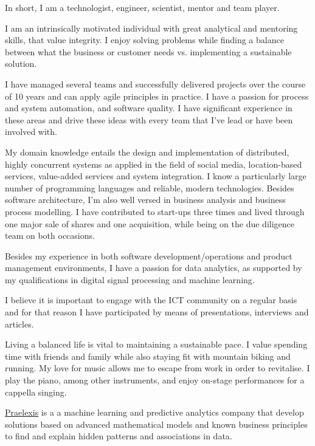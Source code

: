 \documentclass[10pt,a4paper,final]{columncv}
\begin{document}
\pagebreak



In short, I am a technologist, engineer, scientist, mentor and team player.

I am an intrinsically motivated individual with great analytical and mentoring skills, that value integrity. I enjoy solving problems while finding a balance between what the business or customer needs vs. implementing a sustainable solution. 

I have managed several teams and successfully delivered projects over the course of 10 years and can apply agile principles in practice. I have a passion for process and system automation, and software quality. I have significant experience in these areas and drive these ideas with every team that I've lead or have been involved with. 

My domain knowledge entails the design and implementation of distributed, highly concurrent systems as applied in the field of social media, location-based services, value-added services and system integration. I know a particularly large number of programming languages and reliable, modern technologies. Besides software architecture, I'm also well versed in business analysis and business process modelling. I have contributed to start-ups three times and lived through one major sale of shares and one acquisition, while being on the due diligence team on both occasions. 

Besides my experience in both software development/operations and product management environments, I have a passion for data analytics, as supported by my qualifications in digital signal processing and machine learning. 

I believe it is important to engage with the ICT community on a regular basis and for that reason I have participated by means of presentations, interviews and articles. 

Living a balanced life is vital to maintaining a sustainable pace. I value spending time with friends and family while also staying fit with mountain biking and running. My love for music allows me to escape from work in order to revitalise. I play the piano, among other instruments, and enjoy on-stage performances for a cappella singing. 

\noindent \href{http://www.praelexis.com/}{Praelexis} is a a machine learning and predictive 
analytics company that develop solutions based on advanced mathematical models and known 
business principles to find and explain hidden patterns and associations in data. 
\end{document}
